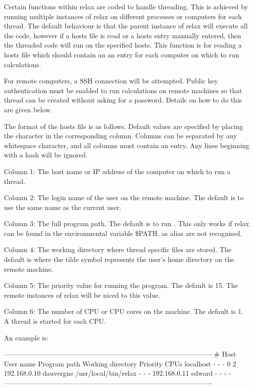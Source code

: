 Certain functions within relax are coded to handle threading.  This is achieved by running
multiple instances of relax on different processes or computers for each thread.  The
default behaviour is that the parent instance of relax will execute all the code, however if
a hosts file is read or a hosts entry manually entered, then the threaded code will run on
the specified hosts.  This function is for reading a hosts file which should contain an
an entry for each computer on which to run calculations.

For remote computers, a SSH connection will be attempted.  Public key authentication must be
enabled to run calculations on remote machines so that thread can be created without asking
for a password.  Details on how to do this are given below.


The format of the hosts file is as follows.  Default values are specified by placing the
character 
 in the corresponding column.  Columns can be separated by any whitespace
character, and all columns must contain an entry.  Any lines beginning with a hash will be
ignored.

Column 1:  The host name or IP address of the computer on which to run a thread.

Column 2:  The login name of the user on the remote machine.  The default is to use the same
name as the current user.

Column 3:  The full program path.  The default is to run 
.  This only works if relax
can be found in the environmental variable \$PATH, as alias are not recognised.

Column 4:  The working directory where thread specific files are stored.  The default is
 where the tilde 
 symbol represents the user's home directory on the remote
machine.

Column 5:  The priority value for running the program.  The default is 15.  The remote
instances of relax will be niced to this value.

Column 6:  The number of CPU or CPU cores on the machine.  The default is 1.  A thread is
started for each CPU.

An example is:

-------------------------------------------------------------------------------------------
\# Host          User name       Program path            Working directory    Priority  CPUs
localhost       -               -                       -                    0         2
192.168.0.10    dauvergne       /usr/local/bin/relax    -                    -         -
192.168.0.11    edward          -                       -                    -         -
-------------------------------------------------------------------------------------------

